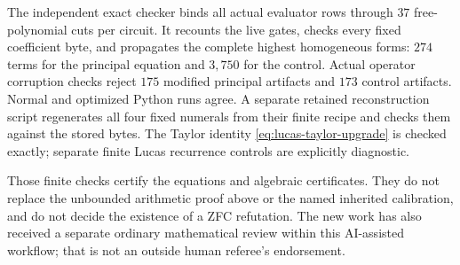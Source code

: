 The independent exact checker binds all actual evaluator rows through $37$
free-polynomial cuts per circuit.  It recounts the live gates, checks every
fixed coefficient byte, and propagates the complete highest homogeneous
forms: $274$ terms for the
principal equation and $3{,}750$ for the control.  Actual operator corruption
checks reject $175$ modified principal artifacts and $173$ control artifacts.
Normal and optimized Python runs agree.  A separate retained reconstruction
script regenerates all four fixed numerals from their finite recipe and
checks them against the stored bytes.  The Taylor identity
\eqref{eq:lucas-taylor-upgrade} is checked exactly; separate finite Lucas
recurrence controls are explicitly diagnostic.

Those finite checks certify the equations and algebraic certificates.  They
do not replace the unbounded arithmetic proof above or the named inherited
calibration, and do not decide the existence of a ZFC refutation.  The new
work has also received a separate ordinary mathematical review within this
AI-assisted workflow; that is not an outside human referee's endorsement.
